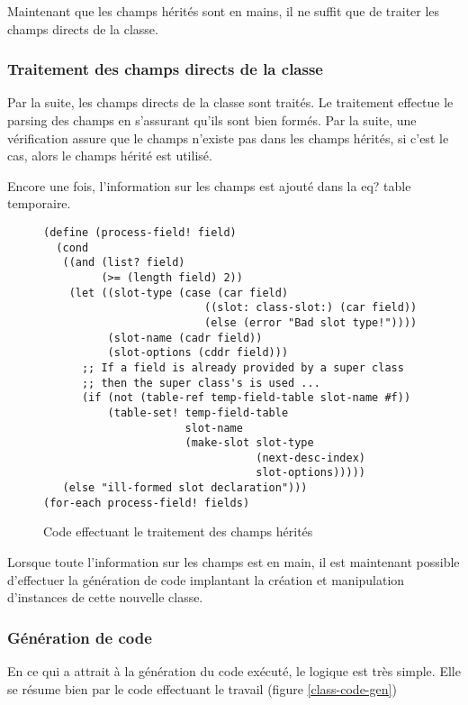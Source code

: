       Maintenant que les champs hérités sont en mains, il ne suffit que de
      traiter les champs directs de la classe.

    \subsubsection{Traitement des champs directs de la classe}
      Par la suite, les champs directs de la classe sont traités. Le
      traitement effectue le \og parsing \fg des champs en s'assurant
      qu'ils sont bien formés. Par la suite, une vérification assure
      que le champs n'existe pas dans les champs hérités, si c'est le
      cas, alors le champs hérité est utilisé.

      Encore une fois, l'information sur les champs est ajouté dans la
      \og eq? table \fg temporaire.

      \begin{figure}[h!]
        \begin{lstlisting}
(define (process-field! field)
  (cond
   ((and (list? field)
         (>= (length field) 2))
    (let ((slot-type (case (car field)
                         ((slot: class-slot:) (car field))
                         (else (error "Bad slot type!"))))
          (slot-name (cadr field))
          (slot-options (cddr field)))
      ;; If a field is already provided by a super class
      ;; then the super class's is used ...
      (if (not (table-ref temp-field-table slot-name #f))
          (table-set! temp-field-table
                      slot-name
                      (make-slot slot-type
                                 (next-desc-index)
                                 slot-options)))))
   (else "ill-formed slot declaration")))
(for-each process-field! fields)
        \end{lstlisting}
        \caption{Code effectuant le traitement des champs hérités}
        \label{heritage-code}
      \end{figure}

      Lorsque toute l'information sur les champs est en main, il est
      maintenant possible d'effectuer la génération de code implantant
      la création et manipulation d'instances de cette nouvelle classe.

    \subsubsection{Génération de code}
      En ce qui a attrait à la génération du code exécuté, le logique
      est très simple. Elle se résume bien par le code effectuant le
      travail (figure \ref{class-code-gen})

